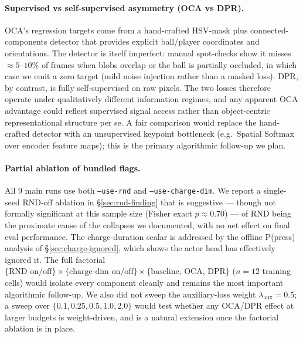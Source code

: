 \documentclass{article}
\begin{document}
\paragraph{Supervised vs self-supervised asymmetry (OCA vs DPR).}
OCA's regression targets come from a hand-crafted HSV-mask plus
connected-components detector that provides explicit ball/player
coordinates and orientations. The detector is itself imperfect:
manual spot-checks show it misses $\approx 5$--$10\%$ of frames
when blobs overlap or the ball is partially occluded, in which
case we emit a zero target (mild noise injection rather than a
masked loss). DPR, by contrast, is fully self-supervised on raw
pixels. The two losses therefore operate under qualitatively
different information regimes, and any apparent OCA advantage
could reflect supervised signal access rather than object-centric
representational structure per se. A fair comparison would replace
the hand-crafted detector with an unsupervised keypoint bottleneck
(e.g.\ Spatial Softmax over encoder feature maps); this is the
primary algorithmic follow-up we plan.

\paragraph{Partial ablation of bundled flags.} All $9$ main runs
use both \texttt{--use-rnd} and \texttt{--use-charge-dim}. We
report a single-seed RND-off ablation in
\S\ref{sec:rnd-finding} that is suggestive --- though not
formally significant at this sample size (Fisher exact
$p \approx 0.70$) --- of RND being the proximate cause of the
collapses we documented, with no net effect on final eval
performance. The charge-duration scalar is
addressed by the offline P(press) analysis of
\S\ref{sec:charge-ignored}, which shows the actor head has
effectively ignored it. The full factorial
$\{\text{RND on/off}\}\times\{\text{charge-dim on/off}\}\times
\{\text{baseline, OCA, DPR}\}$ ($n{=}12$ training cells) would
isolate every component cleanly and remains the most important
algorithmic follow-up. We also did not sweep the auxiliary-loss
weight $\lambda_\text{aux}=0.5$; a sweep over
$\{0.1, 0.25, 0.5, 1.0, 2.0\}$ would test whether any OCA/DPR
effect at larger budgets is weight-driven, and is a natural
extension once the factorial ablation is in place.
\end{document}
